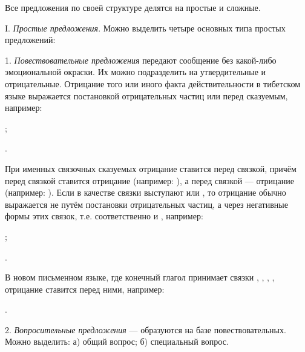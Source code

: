 Все предложения по своей структуре делятся на простые и сложные.

I. \emph{Простые предложения}. Можно выделить четыре основных типа простых предложений:

1. \emph{Повествовательные предложения} передают сообщение без какой-либо эмоциональной окраски. Их можно подразделить на утвердительные и отрицательные. Отрицание того или иного факта действительности в тибетском языке выражается постановкой отрицательных частиц  или  перед сказуемым, например:
\begin{prfsample}
	\item {};
	\item {}.
\end{prfsample}
При именных связочных сказуемых отрицание ставится перед связкой, причём перед связкой
 ставится отрицание  (например: ),
а перед связкой	 --- отрицание  (например:
). Если в качестве связки выступают  или , то отрицание обычно выражается не путём постановки отрицательных частиц, а через негативные формы этих связок, т.е. соответственно  и ,
например:
\begin{prfsample}
	\item {};
	\item {}.
\end{prfsample}

В новом письменном языке, где конечный глагол принимает связки
, , , ,
отрицание ставится перед ними, например:
\begin{prfsample}
	\item {}.
\end{prfsample}

2. \emph{Вопросительные предложения} --- образуются на базе повествовательных. Можно выделить: а) общий вопрос; б) специальный вопрос.


